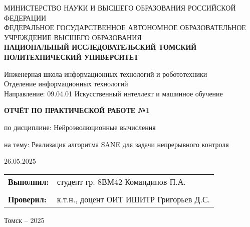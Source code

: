 \documentclass[a4paper,12pt]{article}
\begin{document}
\begin{titlepage}
    \vspace*{1cm}
    {\small
    \begin{center}
    МИНИСТЕРСТВО НАУКИ И ВЫСШЕГО ОБРАЗОВАНИЯ РОССИЙСКОЙ ФЕДЕРАЦИИ\\
    ФЕДЕРАЛЬНОЕ ГОСУДАРСТВЕННОЕ АВТОНОМНОЕ ОБРАЗОВАТЕЛЬНОЕ УЧРЕЖДЕНИЕ ВЫСШЕГО ОБРАЗОВАНИЯ\\
    \textbf{НАЦИОНАЛЬНЫЙ ИССЛЕДОВАТЕЛЬСКИЙ ТОМСКИЙ ПОЛИТЕХНИЧЕСКИЙ УНИВЕРСИТЕТ}
    \end{center}
    }
    \vspace{0.5cm}
    \begin{center}
    Инженерная школа информационных технологий и робототехники\\
    Отделение информационных технологий\\
    Направление: 09.04.01 Искусственный интеллект и машинное обучение
    \end{center}
    \vspace{1cm}
    \begin{center}
    \textbf{ОТЧЁТ ПО ПРАКТИЧЕСКОЙ РАБОТЕ №1}
    \end{center}
    \begin{center}
    по дисциплине: Нейроэволюционные вычисления
    \end{center}
    \vspace{0.5cm}
    \begin{center}
    на тему: Реализация алгоритма SANE для задачи непрерывного контроля
    \end{center}
    \vspace{1cm}
    \hfill 26.05.2025
    \vspace{1cm}
    \begin{tabular}{p{} p{}}
        \textbf{Выполнил:} & студент гр. 8ВМ42 \newline Командинов П.А. \\
        & \\
        \textbf{Проверил:} & к.т.н., доцент ОИТ ИШИТР \newline Григорьев Д.С.
    \end{tabular}
    \vfill
    \begin{center}
    Томск – 2025
    \end{center}
\end{titlepage}

\tableofcontents
\newpage
\end{document}

